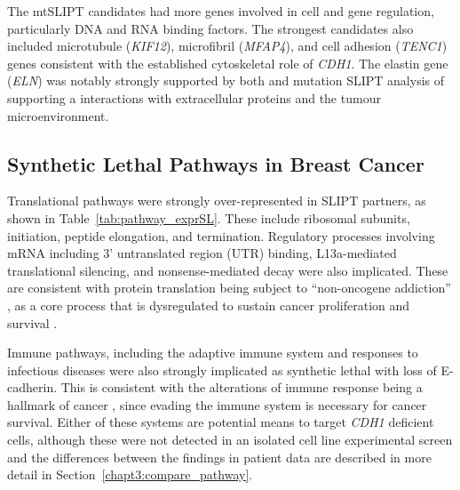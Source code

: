 The \acrshort{mtSLIPT} candidates had more genes involved in cell and gene regulation, particularly \acrshort{DNA} and \acrshort{RNA} binding factors. The strongest candidates also included microtubule (\textit{KIF12}), microfibril (\textit{MFAP4}), and cell adhesion (\textit{TENC1}) genes consistent with the established cytoskeletal role of \textit{CDH1}. The elastin gene (\textit{ELN}) was notably strongly supported by both  and \gls{mutation} \gls{SLIPT} analysis of  supporting a interactions with extracellular proteins and the tumour microenvironment.


\subsection{Synthetic Lethal Pathways in Breast Cancer} \label{chapt3:exprSL_pathways}

Translational pathways were strongly over-represented in \gls{SLIPT} partners, as shown in Table~\ref{tab:pathway_exprSL}. These include ribosomal subunits, initiation, peptide elongation, and termination. Regulatory processes involving \acrshort{mRNA} including 3' untranslated region (UTR) binding, L13a-mediated translational silencing, and nonsense-mediated decay were also implicated. These are consistent with protein translation being subject to ``\gls{non-oncogene addiction}'' \citep{Luo2009}, as a core process that is dysregulated to sustain cancer proliferation and survival \citep{Gao2015}.

Immune pathways, including the adaptive immune system and responses to infectious diseases were also strongly implicated as \gls{synthetic lethal} with loss of \gls{E-cadherin}. This is consistent with the alterations of immune response being a hallmark of cancer \cite{Hanahan2000}, since evading the immune system is necessary for cancer survival. Either of these systems are potential means to target \textit{CDH1} deficient cells, although these were not detected in an isolated cell line experimental screen \citep{Telford2015} and the differences between the findings in patient data are described in more detail in Section~\ref{chapt3:compare_pathway}.

